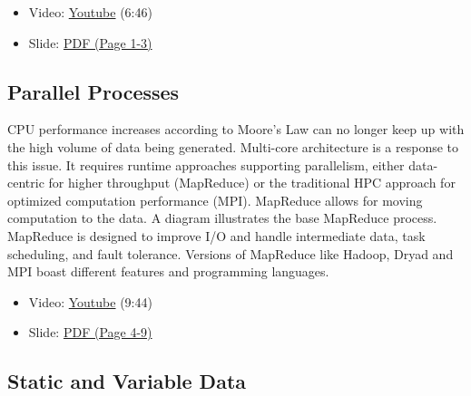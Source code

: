 \begin{itemize}
\tightlist
\item
  Video: \href{https://www.youtube.com/watch?v=CXDdWmAWIvk}{Youtube}
  (6:46)
\item
  Slide:
  \href{https://drive.google.com/open?id=0B88HKpainTSfMFBaNHprbWJwQms}{PDF
  (Page 1-3)}
\end{itemize}

\subsection{Parallel Processes}\label{parallel-processes}

CPU performance increases according to Moore's Law can no longer keep up
with the high volume of data being generated. Multi-core architecture is
a response to this issue. It requires runtime approaches supporting
parallelism, either data-centric for higher throughput (MapReduce) or
the traditional HPC approach for optimized computation performance
(MPI). MapReduce allows for moving computation to the data. A diagram
illustrates the base MapReduce process. MapReduce is designed to improve
I/O and handle intermediate data, task scheduling, and fault tolerance.
Versions of MapReduce like Hadoop, Dryad and MPI boast different
features and programming languages.

\begin{itemize}
\tightlist
\item
  Video: \href{https://www.youtube.com/watch?v=JAYvkIZ8TuE}{Youtube}
  (9:44)
\item
  Slide:
  \href{https://drive.google.com/open?id=0B88HKpainTSfMFBaNHprbWJwQms}{PDF
  (Page 4-9)}
\end{itemize}

\subsection{Static and Variable Data}\label{static-and-variable-data}

